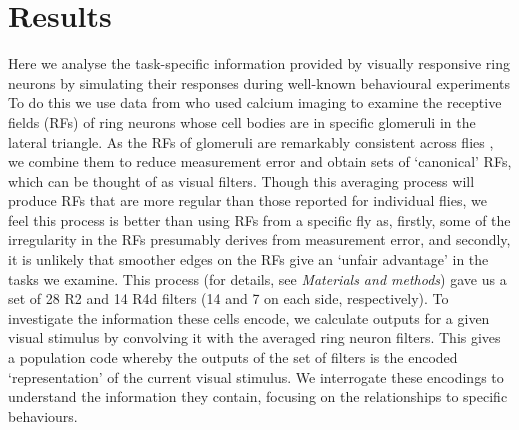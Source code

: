 \documentclass[10pt]{article}
\begin{document}
\section*{Results}
Here we analyse the task-specific information provided by visually responsive ring neurons by simulating their responses during well-known behavioural experiments  To do this we use data from \cite{Seelig2013} who used calcium imaging to examine the receptive fields (RFs) of ring neurons whose cell bodies are in specific glomeruli in the lateral triangle. As the RFs of glomeruli are remarkably consistent across flies \cite{Seelig2013}, we combine them to reduce measurement error and obtain sets of ‘canonical’ RFs, which can be thought of as visual filters. Though this averaging process will produce RFs that are more regular than those reported for individual flies, we feel this process is better than using RFs from a specific fly as, firstly, some of the irregularity in the RFs presumably derives from measurement error, and secondly, it is unlikely that smoother edges on the RFs give an ‘unfair advantage’ in the tasks we examine. This process (for details, see \emph{Materials and methods}) gave us a set of 28 R2 and 14 R4d filters (14 and 7 on each side, respectively). To investigate the information these cells encode, we calculate outputs for a given visual stimulus by convolving it with the averaged ring neuron filters. This gives a population code whereby the outputs of the set of filters is the encoded ‘representation’ of the current visual stimulus. We interrogate these encodings to understand the information they contain, focusing on the relationships to specific behaviours.
\end{document}
